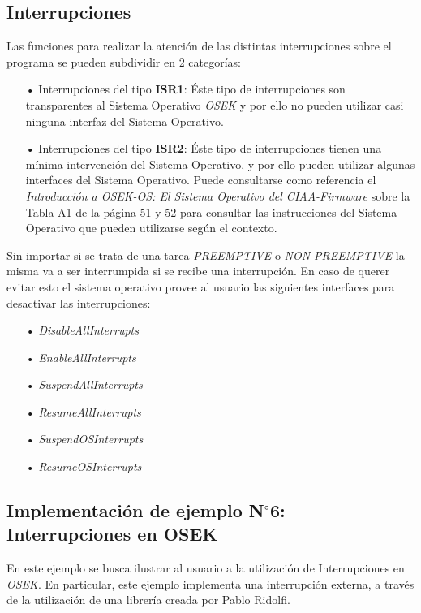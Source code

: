 \documentclass[12pt,letterpaper]{article}
\begin{document}
\subsection{Interrupciones}
Las funciones para realizar la atención de las distintas interrupciones sobre el programa se pueden subdividir en 2 categorías:
\begin{enumerate}
\item[•]Interrupciones del tipo \textbf{ISR1}: Éste tipo de interrupciones son transparentes al Sistema Operativo \textit{OSEK} y por ello no pueden utilizar casi ninguna interfaz del Sistema Operativo.
\item[•]Interrupciones del tipo \textbf{ISR2}: Éste tipo de interrupciones tienen una mínima intervención del Sistema Operativo, y por ello pueden utilizar algunas interfaces del Sistema Operativo. Puede consultarse como referencia el \textit{Introducción a OSEK-OS: El Sistema Operativo del CIAA-Firmware} sobre la Tabla A1 de la página 51 y 52 para consultar las instrucciones del Sistema Operativo que pueden utilizarse según el contexto.
\end{enumerate}

Sin importar si se trata de una tarea \textit{PREEMPTIVE} o \textit{NON PREEMPTIVE} la misma va a ser interrumpida si se recibe una interrupción. En caso de querer evitar esto el sistema operativo provee al usuario las siguientes
interfaces para desactivar las interrupciones:
\begin{enumerate}
\item[•]\textit{DisableAllInterrupts}
\item[•]\textit{EnableAllInterrupts}
\item[•]\textit{SuspendAllInterrupts}
\item[•]\textit{ResumeAllInterrupts}
\item[•]\textit{SuspendOSInterrupts}
\item[•]\textit{ResumeOSInterrupts}
\end{enumerate}

\subsection{Implementación de ejemplo N$^{\circ}$6: Interrupciones en OSEK}
En este ejemplo se busca ilustrar al usuario a la utilización de Interrupciones en \textit{OSEK}. En particular, este ejemplo implementa una interrupción externa, a través de la utilización de una librería creada por Pablo Ridolfi.
 \\
 
\end{document}
